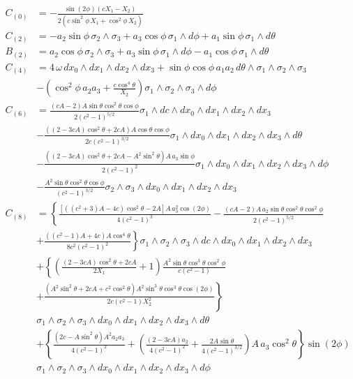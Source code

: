\begin{align*}
C_{(0)} & = 
-\frac{\sin(2 \phi ) (c X_1-X_2)}{2  (c \sin^2\phi \, X_1+\cos^2\phi \,X_2)}\\
%
C_{(2)} & = 
- a_2 \sin\phi \,
\sigma_2\wedge \sigma_3
+ a_3 \cos\phi \,
\sigma_1\wedge d\phi
+ a_1 \sin\phi \,
\sigma_1\wedge d\theta\\
% 
B_{(2)} & =
a_2 \cos\phi \,
\sigma_2\wedge \sigma_3
+ a_3 \sin\phi \,
\sigma_1\wedge d\phi
- a_1 \cos\phi \,
\sigma_1\wedge d\theta\\
% 
C_{(4)} & =
4 \, \omega \,
dx_0\wedge dx_1\wedge dx_2\wedge dx_3 
+ \sin\phi \cos\phi \, a_1 a_2 \,
d\theta\wedge \sigma_1\wedge \sigma_2\wedge \sigma_3\\
&
-\left(\cos ^2\phi \, a_2 a_3 +\frac{c \cos^4\theta}{X_2}\right) 
\sigma_1\wedge \sigma_2\wedge \sigma_3 \wedge d\phi \\
% 
C_{(6)} &=
\frac{(c A-2) A \sin\theta \cos^2\theta \cos\phi}{2 \left(c^2-1\right)^{5/2}} 
\sigma_1\wedge dc\wedge dx_0\wedge dx_1\wedge dx_2\wedge dx_3\\
&
-\frac{ \left((2-3 c A) \cos^2\theta + 2 c A \right)A \cos\theta \cos\phi}{2 c \left(c^2-1\right)^{3/2}}
\sigma_1\wedge dx_0 \wedge dx_1\wedge dx_2\wedge dx_3\wedge d\theta\\
&
-\frac{\left((2-3 c A) \cos^2\theta + 2 c A - A^2 \sin^2\theta \right)A \, a_3 \sin\phi }{2 \left(c^2-1\right)^{2}}
\sigma_1\wedge dx_0 \wedge dx_1\wedge dx_2\wedge dx_3\wedge d\phi\\
&
-\frac{A^2 \sin\theta \cos^2\theta \cos\phi}{\left(c^2-1\right)^{3/2}}
\sigma_2 \wedge \sigma_3 \wedge dx_0 \wedge dx_1\wedge dx_2\wedge dx_3\\
%
C_{(8)} &= 
\left\{
\frac{\left[\left(\left(c^2+3\right) A-4 c\right) \cos^2\theta -2 A\right]A \, a_3^2\cos (2 \phi )  }{4 \left(c^2-1\right)^3}
-\frac{(c A-2)A\, a_2 \sin\theta \cos^2\theta \cos ^2\phi }{2 \left(c^2-1\right)^{5/2}}
\right.\\
&\left.
+\frac{((c^2-1) A+4 c)A \cos^4\theta}{8 c^2 \left(c^2-1\right)^2}
\right\}
\sigma_1\wedge \sigma_2\wedge \sigma_3\wedge dc\wedge dx_0\wedge dx_1\wedge dx_2\wedge dx_3\\
&+\left\{
\left(\frac{(2-3 c A) \cos^2\theta +2 c A}{2 X_1}+1\right)\frac{ A^2 \sin\theta \cos^3\theta \cos^2\phi}{c \left(c^2-1\right)} 
\right.\\
&\left.
+\frac{\left(A^2 \sin^2\theta +2 c A+c^2 \cos^2\theta \right) A^2 \sin^3\theta \cos^3\theta \cos(2 \phi ) }{2 c \left(c^2-1\right)  X_2^2}\right\}\\
&
\sigma_1\wedge \sigma_2\wedge \sigma_3\wedge dx_0\wedge dx_1\wedge dx_2\wedge dx_3\wedge d\theta\\
&+ \left\{
\frac{ \left(2 c-A \sin^2\theta \right)A^2 a_2 a_3}{4 \left(c^2-1\right)^2}+\left(\frac{(2-3 c A) a_2}{4 \left(c^2-1\right)^2}+\frac{2 A \sin\theta}{4 \left(c^2-1\right)^{3/2}}\right)A \, a_3 \cos^2\theta  \right\}\sin (2 \phi )\\
&
\sigma_1\wedge \sigma_2\wedge \sigma_3\wedge dx_0\wedge dx_1\wedge dx_2\wedge dx_3\wedge d\phi
\end{align*}

